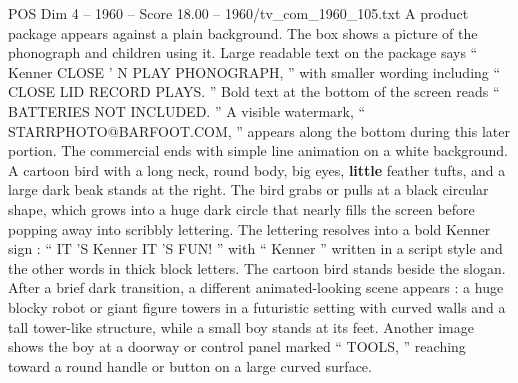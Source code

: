 \begin{textsample}{POS Dim 4 – 1960 – Score 18.00 – 1960/tv\_com\_1960\_105.txt}
A product package appears against a plain background.
The box shows a picture of the phonograph and children using it.
Large readable text on the package says “ Kenner CLOSE ’ N PLAY PHONOGRAPH, ” with smaller wording including “ CLOSE LID RECORD PLAYS. ” Bold text at the bottom of the screen reads “ BATTERIES NOT INCLUDED. ” A visible watermark, “ STARRPHOTO@BARFOOT.COM, ” appears along the bottom during this later portion.
The commercial ends with simple line animation on a white background.
A cartoon bird with a long neck, round body, big eyes, \textbf{little} feather tufts, and a large dark beak stands at the right.
The bird grabs or pulls at a black circular shape, which grows into a huge dark circle that nearly fills the screen before popping away into scribbly lettering.
The lettering resolves into a bold Kenner sign : “ IT ’S Kenner IT ’S FUN! ” with “ Kenner ” written in a script style and the other words in thick block letters.
The cartoon bird stands beside the slogan.
After a brief dark transition, a different animated-looking scene appears : a huge blocky robot or giant figure towers in a futuristic setting with curved walls and a tall tower-like structure, while a small boy stands at its feet.
Another image shows the boy at a doorway or control panel marked “ TOOLS, ” reaching toward a round handle or button on a large curved surface.

\end{textsample}
